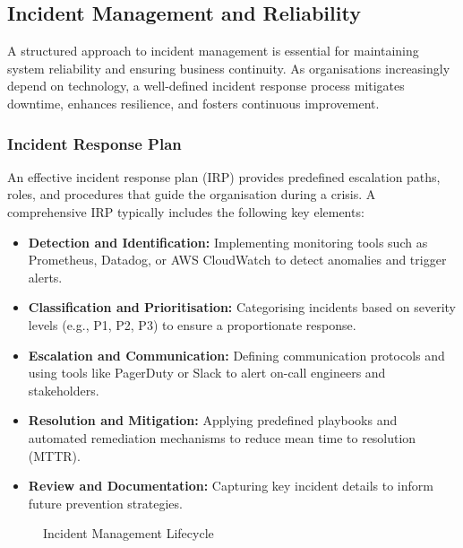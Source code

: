 \subsection{Incident Management and Reliability}

A structured approach to incident management is essential for maintaining system reliability and ensuring business continuity. As organisations increasingly depend on technology, a well-defined incident response process mitigates downtime, enhances resilience, and fosters continuous improvement.

\subsubsection{Incident Response Plan}

An effective incident response plan (IRP) provides predefined escalation paths, roles, and procedures that guide the organisation during a crisis. A comprehensive IRP typically includes the following key elements:

\begin{itemize}
    \item \textbf{Detection and Identification:} Implementing monitoring tools such as Prometheus, Datadog, or AWS CloudWatch to detect anomalies and trigger alerts.
    \item \textbf{Classification and Prioritisation:} Categorising incidents based on severity levels (e.g., P1, P2, P3) to ensure a proportionate response.
    \item \textbf{Escalation and Communication:} Defining communication protocols and using tools like PagerDuty or Slack to alert on-call engineers and stakeholders.
    \item \textbf{Resolution and Mitigation:} Applying predefined playbooks and automated remediation mechanisms to reduce mean time to resolution (MTTR).
    \item \textbf{Review and Documentation:} Capturing key incident details to inform future prevention strategies.
\end{itemize}

\begin{figure}[H]
    \centering
    \caption{Incident Management Lifecycle}
    \label{fig:incident-lifecycle}
\end{figure}


